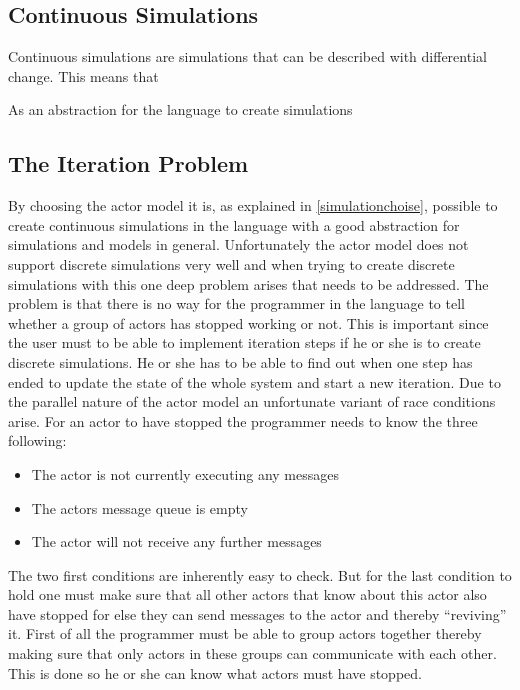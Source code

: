 \subsection{Continuous Simulations}
Continuous simulations are simulations that can be described with differential change. This means that 

\label{simulationchoise}
As an abstraction for the language to create simulations

\subsection{The Iteration Problem}
By choosing the actor model it is, as explained in \cref{simulationchoise}, possible to create continuous simulations in the language with a good abstraction for simulations and models in general. Unfortunately the actor model does not support discrete simulations very well and when trying to create discrete simulations with this one deep problem arises that needs to be addressed.
The problem is that there is no way for the programmer in the language to tell whether a group of actors has stopped working or not. This is important since the user must to be able to implement iteration steps if he or she is to create discrete simulations. He or she has to be able to find out when one step has ended to update the state of the whole system and start a new iteration. Due to the parallel nature of the actor model an unfortunate variant of race conditions arise.
For an actor to have stopped the programmer needs to know the three following:
\begin{itemize}
\item The actor is not currently executing any messages
\item The actors message queue is empty
\item The actor will not receive any further messages
\end{itemize}
The two first conditions are inherently easy to check. But for the last condition to hold one must make sure that all other actors that know about this actor also have stopped for else they can send messages to the actor and thereby \enquote{reviving} it. First of all the programmer must be able to group actors together thereby making sure that only actors in these groups can communicate with each other. This is done so he or she can know what actors must have stopped.

